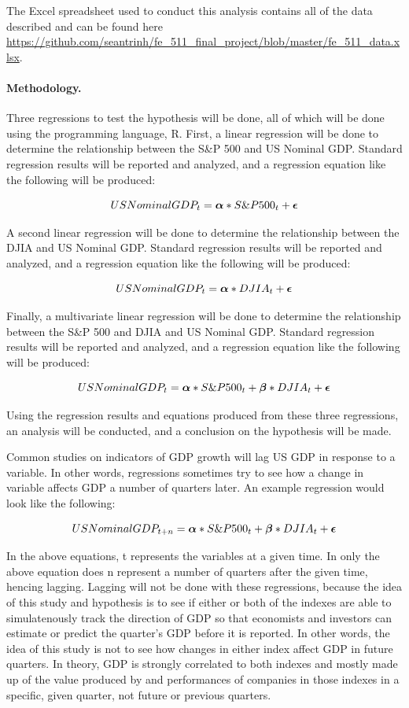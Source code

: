 \documentclass[11pt]{article}
\numberwithin{equation}{section}
\def\alp{\mbox{\boldmath$\alpha$\unboldmath}}
\def\bet{\mbox{\boldmath$\beta$\unboldmath}}
\def\epsi{\mbox{\boldmath$\epsilon$\unboldmath}}
\begin{document}
The Excel spreadsheet used to conduct this analysis contains all of the data described and can be found here \url{https://github.com/seantrinh/fe_511_final_project/blob/master/fe_511_data.xlsx}.

\paragraph{Methodology.}
Three regressions to test the hypothesis will be done, all of which will be done using the programming language, R. First, a linear regression will be done to determine the relationship between the S\&P 500 and US Nominal GDP. Standard regression results will be reported and analyzed, and a regression equation like the following will be produced:

\[ US Nominal GDP_{t} = \alp*S\&P500_{t} + \epsi \]

A second linear regression will be done to determine the relationship between the DJIA and US Nominal GDP. Standard regression results will be reported and analyzed, and a regression equation like the following will be produced:

\[ US Nominal GDP_{t} = \alp*DJIA_{t} + \epsi \]

Finally, a multivariate linear regression will be done to determine the relationship between the S\&P 500 and DJIA and US Nominal GDP. Standard regression results will be reported and analyzed, and a regression equation like the following will be produced:

\[ US Nominal GDP_{t} = \alp*S\&P500_{t} + \bet*DJIA_{t} + \epsi \]

Using the regression results and equations produced from these three regressions, an analysis will be conducted, and a conclusion on the hypothesis will be made.

Common studies on indicators of GDP growth will lag US GDP in response to a variable. In other words, regressions sometimes try to see how a change in variable affects GDP a number of quarters later. An example regression would look like the following:

\[ US Nominal GDP_{t+n} = \alp*S\&P500_{t} + \bet*DJIA_{t} + \epsi \]

In the above equations, t represents the variables at a given time. In only the above equation does n represent a number of quarters after the given time, hencing lagging. Lagging will not be done with these regressions, because the idea of this study and hypothesis is to see if either or both of the indexes are able to simulatenously track the direction of GDP so that economists and investors can estimate or predict the quarter's GDP before it is reported. In other words, the idea of this study is not to see how changes in either index affect GDP in future quarters. In theory, GDP is strongly correlated to both indexes and mostly made up of the value produced by and performances of companies in those indexes in a specific, given quarter, not future or previous quarters.
\end{document}
